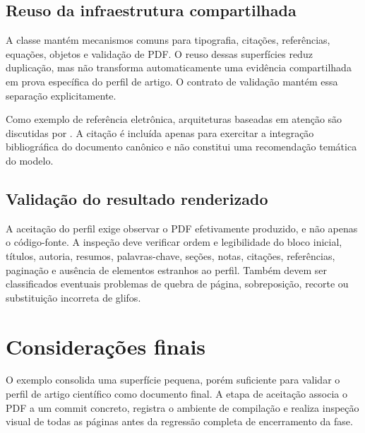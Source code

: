 \documentclass{abntexto-ufc}
\begin{document}
\subsection{Reuso da infraestrutura compartilhada}

A classe mantém mecanismos comuns para tipografia, citações, referências, equações, objetos e validação de PDF. O reuso dessas superfícies reduz duplicação, mas não transforma automaticamente uma evidência compartilhada em prova específica do perfil de artigo. O contrato de validação mantém essa separação explicitamente.

Como exemplo de referência eletrônica, arquiteturas baseadas em atenção são discutidas por \textcite{vaswani2017attention}. A citação é incluída apenas para exercitar a integração bibliográfica do documento canônico e não constitui uma recomendação temática do modelo.

\subsection{Validação do resultado renderizado}

A aceitação do perfil exige observar o PDF efetivamente produzido, e não apenas o código-fonte. A inspeção deve verificar ordem e legibilidade do bloco inicial, títulos, autoria, resumos, palavras-chave, seções, notas, citações, referências, paginação e ausência de elementos estranhos ao perfil. Também devem ser classificados eventuais problemas de quebra de página, sobreposição, recorte ou substituição incorreta de glifos.

\section{Considerações finais}

O exemplo consolida uma superfície pequena, porém suficiente para validar o perfil de artigo científico como documento final. A etapa de aceitação associa o PDF a um commit concreto, registra o ambiente de compilação e realiza inspeção visual de todas as páginas antes da regressão completa de encerramento da fase.

\nocite{knuth}
\ufcPrintReferences
\end{document}
